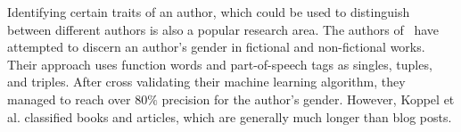 Identifying certain traits of an author, which could be used to distinguish between different authors is also a popular research area.
The authors of~\cite{koppel2003automatically} have attempted to discern an author's gender in fictional and non-fictional works.
Their approach uses function words and part-of-speech tags as singles, tuples, and triples.
After cross validating their machine learning algorithm, they managed to reach over $80\%$ precision for the author's gender.
However, Koppel et al. classified books and articles, which are generally much longer than blog posts.
